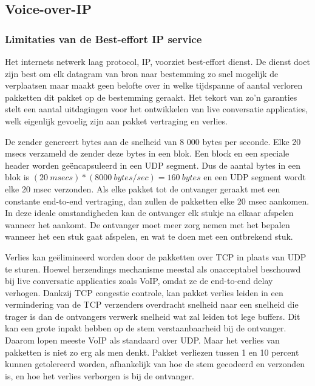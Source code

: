 \subsection{Voice-over-IP}

\subsubsection{Limitaties van de Best-effort IP service}

\noindent Het internets netwerk laag protocol, IP, voorziet best-effort dienst. De dienst doet zijn best om elk datagram van bron naar bestemming zo snel mogelijk de verplaatsen maar maakt geen belofte over in welke tijdspanne of aantal verloren pakketten dit pakket op de bestemming geraakt. Het tekort van zo’n garanties stelt een aantal uitdagingen voor het ontwikkelen van live conversatie applicaties, welk eigenlijk gevoelig zijn aan pakket vertraging en verlies.

\noindent De zender genereert bytes aan de snelheid van 8 000 bytes per seconde. Elke 20 msecs verzameld de zender deze bytes in een blok. Een block en een speciale header worden geëncapsuleerd in een UDP segment. Dus de aantal bytes in een blok is $(20 \ msecs) * (8 000 \ bytes / sec) = 160 \ bytes$ en een UDP segment wordt elke 20 msec verzonden.
Als elke pakket tot de ontvanger geraakt met een constante end-to-end vertraging, dan zullen de pakketten elke 20 msec aankomen. In deze ideale omstandigheden kan de ontvanger elk stukje na elkaar afspelen wanneer het aankomt.
De ontvanger moet meer zorg nemen met het bepalen wanneer het een stuk gaat afspelen, en wat te doen met een ontbrekend stuk.


\noindent Verlies kan geëlimineerd worden door de pakketten over TCP in plaats van UDP te sturen. Hoewel herzendings mechanisme meestal als onacceptabel beschouwd bij live conversatie applicaties zoals VoIP, omdat ze de end-to-end delay verhogen. Dankzij TCP congestie controle, kan pakket verlies leiden in een vermindering van de TCP verzenders overdracht snelheid naar een snelheid die trager is dan de ontvangers verwerk snelheid wat zal leiden tot lege buffers. Dit kan een grote inpakt hebben op de stem verstaanbaarheid bij de ontvanger. Daarom lopen meeste VoIP als standaard over UDP.
Maar het verlies van pakketten is niet zo erg als men denkt. Pakket verliezen tussen 1 en 10 percent kunnen getolereerd worden, afhankelijk van hoe de stem gecodeerd en verzonden is, en hoe het verlies verborgen is bij de ontvanger.

